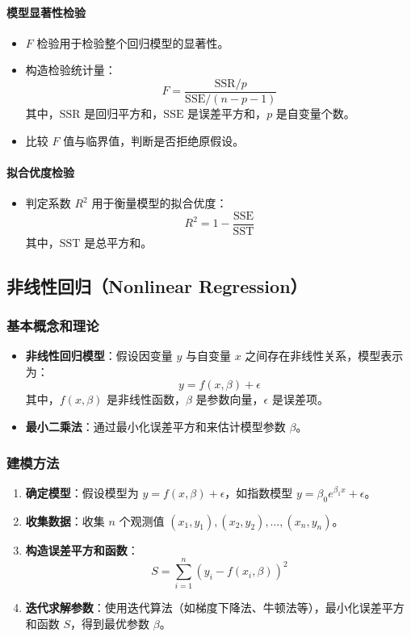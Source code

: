 \documentclass[UTF8]{ctexart}
\begin{document}
\paragraph{模型显著性检验}
\begin{itemize}
    \item \(F\) 检验用于检验整个回归模型的显著性。
    \item 构造检验统计量：
    \[
    F = \frac{\text{SSR}/p}{\text{SSE}/(n-p-1)}
    \]
    其中，\(\text{SSR}\) 是回归平方和，\(\text{SSE}\) 是误差平方和，\(p\) 是自变量个数。
    \item 比较 \(F\) 值与临界值，判断是否拒绝原假设。
\end{itemize}

\paragraph{拟合优度检验}
\begin{itemize}
    \item 判定系数 \(R^2\) 用于衡量模型的拟合优度：
    \[
    R^2 = 1 - \frac{\text{SSE}}{\text{SST}}
    \]
    其中，\(\text{SST}\) 是总平方和。
\end{itemize}

\subsection {非线性回归（Nonlinear Regression）}
\subsubsection {基本概念和理论}
\begin{itemize}
    \item \textbf{非线性回归模型}：假设因变量 \( y \) 与自变量 \( x \) 之间存在非线性关系，模型表示为：
    \[
    y = f(x, \beta) + \epsilon
    \]
    其中，\(f(x, \beta)\) 是非线性函数，\(\beta\) 是参数向量，\(\epsilon\) 是误差项。
    \item \textbf{最小二乘法}：通过最小化误差平方和来估计模型参数 \(\beta\)。
\end{itemize}

\subsubsection {建模方法}
\begin{enumerate}
    \item \textbf{确定模型}：假设模型为 \( y = f(x, \beta) + \epsilon \)，如指数模型 \( y = \beta_0 e^{\beta_1 x} + \epsilon \)。
    \item \textbf{收集数据}：收集 \( n \) 个观测值 \((x_1, y_1), (x_2, y_2), \ldots, (x_n, y_n) \)。
    \item \textbf{构造误差平方和函数}：
    \[
    S = \sum_{i=1}^{n} (y_i - f(x_i, \beta))^2
    \]
    \item \textbf{迭代求解参数}：使用迭代算法（如梯度下降法、牛顿法等），最小化误差平方和函数 \( S \)，得到最优参数 \(\beta\)。
\end{enumerate}
\end{document}
